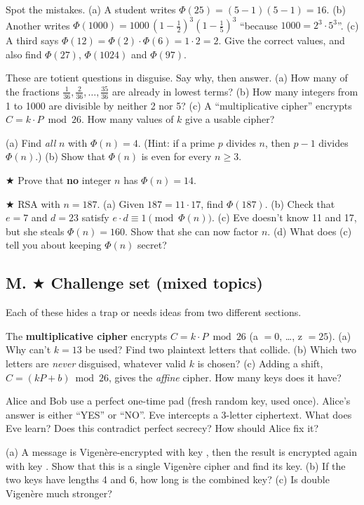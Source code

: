 \q Spot the mistakes.
(a) A student writes $\Phi(25) = (5-1)(5-1) = 16$.
(b) Another writes $\Phi(1000) = 1000\,(1 - \tfrac12)^3 (1 - \tfrac15)^3$ ``because $1000 = 2^3 \cdot 5^3$''.
(c) A third says $\Phi(12) = \Phi(2)\cdot\Phi(6) = 1 \cdot 2 = 2$.
Give the correct values, and also find $\Phi(27)$, $\Phi(1024)$ and $\Phi(97)$.

\q These are totient questions in disguise. Say why, then answer.
(a) How many of the fractions $\frac{1}{36}, \frac{2}{36}, \dots, \frac{35}{36}$ are already in lowest terms?
(b) How many integers from 1 to 1000 are divisible by neither 2 nor 5?
(c) A ``multiplicative cipher'' encrypts $C = k\cdot P \bmod 26$. How many values of $k$ give a usable cipher?

\q (a) Find \emph{all} $n$ with $\Phi(n) = 4$. (Hint: if a prime $p$ divides $n$, then $p - 1$ divides $\Phi(n)$.)
(b) Show that $\Phi(n)$ is even for every $n \ge 3$.

\q $\bigstar$ Prove that \textbf{no} integer $n$ has $\Phi(n) = 14$.

\q $\bigstar$ RSA with $n = 187$.
(a) Given $187 = 11 \cdot 17$, find $\Phi(187)$.
(b) Check that $e = 7$ and $d = 23$ satisfy $e\cdot d \equiv 1 \pmod{\Phi(n)}$.
(c) Eve doesn't know 11 and 17, but she steals $\Phi(n) = 160$. Show that she can now factor $n$.
(d) What does (c) tell you about keeping $\Phi(n)$ secret?

\subsection*{M. $\bigstar$ Challenge set (mixed topics)}
Each of these hides a trap or needs ideas from two different sections.

\q The \textbf{multiplicative cipher} encrypts $C = k\cdot P \bmod 26$ (a $=0$, \dots, z $=25$).
(a) Why can't $k = 13$ be used? Find two plaintext letters that collide.
(b) Which two letters are \emph{never} disguised, whatever valid $k$ is chosen?
(c) Adding a shift, $C = (kP + b) \bmod 26$, gives the \emph{affine} cipher. How many keys does it have?

\q Alice and Bob use a perfect one-time pad (fresh random key, used once). Alice's answer is either ``YES'' or ``NO''. Eve intercepts a 3-letter ciphertext.
What does Eve learn? Does this contradict perfect secrecy? How should Alice fix it?

\q (a) A message is Vigen\`ere-encrypted with key , then the result is encrypted again with key . Show that this is a single Vigen\`ere cipher and find its key.
(b) If the two keys have lengths 4 and 6, how long is the combined key?
(c) Is double Vigen\`ere much stronger?

